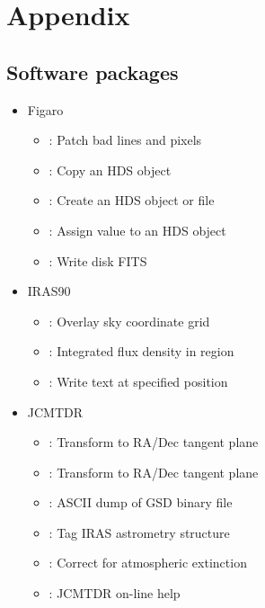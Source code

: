 \newpage
\appendix
\section{Appendix}

\subsection{\label{packs}Software packages}

\begin{itemize}
\item Figaro 
   \begin{itemize}
   \item {}: Patch bad lines and pixels
   \item {}: Copy an HDS object
   \item {}: Create an HDS object or file
   \item {}: Assign value to an HDS object
   \item {}: Write disk FITS
   \end{itemize}
\item IRAS90 
   \begin{itemize}
   \item {}: Overlay sky coordinate grid
   \item {}: Integrated flux density in region
   \item {}: Write text at specified position
   \end{itemize}
\item JCMTDR 
   \begin{itemize}
   \item {}: Transform to RA/Dec tangent plane
   \item {}: Transform to RA/Dec tangent plane
   \item {}: ASCII dump of GSD binary file
   \item {}: Tag IRAS astrometry structure
   \item {}: Correct for atmospheric extinction
   \item {}: JCMTDR on-line help

\end{itemize}
\end{itemize}
